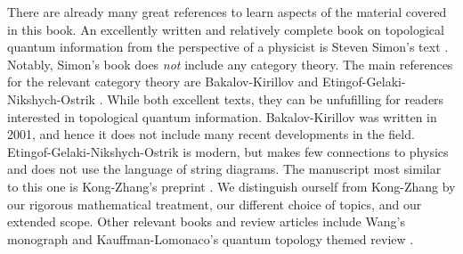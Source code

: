 There are already many great references to learn aspects of the material covered in this book. An excellently written and relatively complete book on topological quantum information from the perspective of a physicist is Steven Simon's text \cite{simon2023topological}. Notably, Simon's book does{ \em not} include any category theory. The main references for the relevant category theory are Bakalov-Kirillov \cite{bakalov2001lectures} and Etingof-Gelaki-Nikshych-Ostrik \cite{etingof2016tensor}. While both excellent texts, they can be unfufilling for readers interested in topological quantum information. Bakalov-Kirillov was written in 2001, and hence it does not include many recent developments in the field. Etingof-Gelaki-Nikshych-Ostrik is modern, but makes few connections to physics and does not use the language of string diagrams. The manuscript most similar to this one is Kong-Zhang's preprint \cite{kong2022invitation}. We distinguish ourself from Kong-Zhang by our rigorous mathematical treatment, our different choice of topics, and our extended scope. Other relevant books and review articles include Wang's monograph \cite{wang2010topological} and Kauffman-Lomonaco's quantum topology themed review \cite{kauffman2009topological}.

